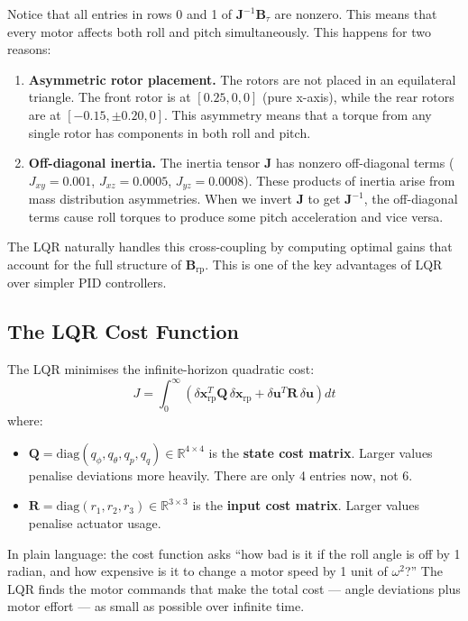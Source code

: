\documentclass[12pt, a4paper]{article}
\newcommand{\R}{\mathbb{R}}
\newcommand{\bx}{\bm{x}}
\newcommand{\bu}{\bm{u}}
\newcommand{\bJ}{\bm{J}}
\newcommand{\bB}{\bm{B}}
\newcommand{\bQ}{\bm{Q}}
\newcommand{\bR}{\bm{R}}
\begin{document}
Notice that all entries in rows 0 and 1 of $\bJ^{-1} \bB_\tau$ are nonzero.  This means that every motor affects both roll and pitch simultaneously.  This happens for two reasons:

\begin{enumerate}
    \item \textbf{Asymmetric rotor placement.}  The rotors are not placed in an equilateral triangle.  The front rotor is at $[0.25, 0, 0]$ (pure x-axis), while the rear rotors are at $[-0.15, \pm 0.20, 0]$.  This asymmetry means that a torque from any single rotor has components in both roll and pitch.

    \item \textbf{Off-diagonal inertia.}  The inertia tensor $\bJ$ has nonzero off-diagonal terms ($J_{xy} = 0.001$, $J_{xz} = 0.0005$, $J_{yz} = 0.0008$).  These products of inertia arise from mass distribution asymmetries.  When we invert $\bJ$ to get $\bJ^{-1}$, the off-diagonal terms cause roll torques to produce some pitch acceleration and vice versa.
\end{enumerate}

The LQR naturally handles this cross-coupling by computing optimal gains that account for the full structure of $\bB_{\text{rp}}$.  This is one of the key advantages of LQR over simpler PID controllers.

\subsection{The LQR Cost Function}

The LQR minimises the infinite-horizon quadratic cost:
\begin{equation}
    J = \int_0^\infty \left( \delta \bx_{\text{rp}}^T \bQ \, \delta \bx_{\text{rp}} + \delta \bu^T \bR \, \delta \bu \right) dt
\end{equation}
where:
\begin{itemize}
    \item $\bQ = \text{diag}(q_\phi, q_\theta, q_p, q_q) \in \R^{4 \times 4}$ is the \textbf{state cost matrix}.  Larger values penalise deviations more heavily.  There are only 4 entries now, not 6.
    \item $\bR = \text{diag}(r_1, r_2, r_3) \in \R^{3 \times 3}$ is the \textbf{input cost matrix}.  Larger values penalise actuator usage.
\end{itemize}

In plain language: the cost function asks ``how bad is it if the roll angle is off by 1 radian, and how expensive is it to change a motor speed by 1 unit of $\omega^2$?''  The LQR finds the motor commands that make the total cost --- angle deviations plus motor effort --- as small as possible over infinite time.
\end{document}
